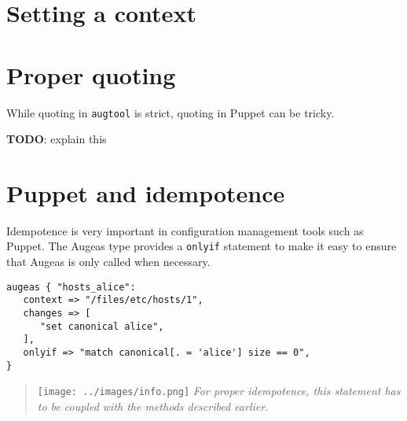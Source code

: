 \section{Setting a context}

\section{Proper quoting}

While quoting in \verb!augtool! is strict, quoting in Puppet can be tricky.

\textbf{TODO}: explain this

\section{Puppet and idempotence}

Idempotence is very important in configuration management tools such as Puppet. The Augeas type provides a \verb!onlyif! statement to make it easy to ensure that Augeas is only called when necessary.

\begin{verbatim}
augeas { "hosts_alice":
   context => "/files/etc/hosts/1",
   changes => [
      "set canonical alice",
   ],
   onlyif => "match canonical[. = 'alice'] size == 0",
}
\end{verbatim}

\begin{quote}
\texttt{[image: ../images/info.png]} \emph{For proper idempotence, this statement has to be coupled with the methods described earlier.}
\end{quote}

